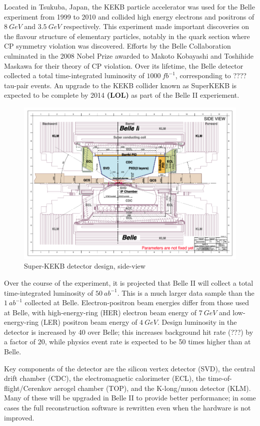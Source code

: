 \documentclass[12pt]{thesis}  %
\begin{document}
Located in Tsukuba, Japan, the KEKB particle accelerator was used for the Belle experiment from 1999 to 2010 and collided high energy electrons and positrons of $\SI{8}{GeV}$ and $\SI{3.5}{GeV}$ respectively. This experiment made important discoveries on the flavour structure of elementary particles, notably in the quark section where CP symmetry violation was discovered. Efforts by the Belle Collaboration culminated in the 2008 Nobel Prize awarded to Makoto Kobayashi and Toshihide Maskawa for their theory of CP violation. Over its lifetime, the Belle detector collected a total time-integrated luminosity of $\SI{1000}{fb^{-1}}$, corresponding to ???? tau-pair events. An upgrade to the KEKB collider known as SuperKEKB is expected to be complete by 2014 \textbf{(LOL)} as part of the Belle II experiement.

\begin{figure}[h]
\centering
\includegraphics[width=0.7\linewidth]{images/super-kekb-side-view.png}
\caption{Super-KEKB detector design, side-view}
\label{}
\end{figure}

Over the course of the experiment, it is projected that Belle II will collect a total time-integrated luminosity of $\SI{50}{ab^{-1}}$. This is a much larger data sample than the $\SI{1}{ab^{-1}}$ collected at Belle. Electron-positron beam energies differ from those used at Belle, with high-energy-ring (HER) electron beam energy of $\SI{7}{GeV}$ and low-energy-ring (LER) positron beam energy  of $\SI{4}{GeV}$. Design luminosity in the detector is increased by 40 over Belle; this increases background hit rate (???) by a factor of 20, while physics event rate is expected to be 50 times higher than at Belle.

Key components of the detector are the silicon vertex detector (SVD), the central drift chamber (CDC), the electromagnetic calorimeter (ECL), the time-of-flight/Cerenkov aerogel chamber (TOP), and the K-long/muon detector (KLM). Many of these will be upgraded in Belle II to provide better performance; in some cases the full reconstruction software is rewritten even when the hardware is not improved.
\end{document}
